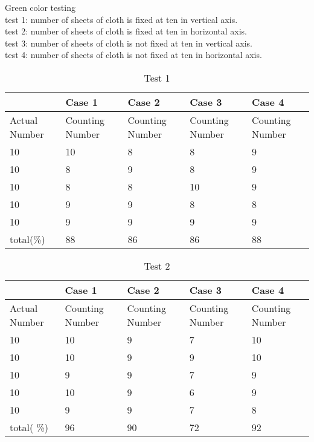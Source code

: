 Green color testing\\
test 1: number of sheets of cloth is fixed at ten in vertical axis.\\ 
test 2: number of sheets of cloth is fixed at ten in horizontal axis.\\
test 3: number of sheets of cloth is not fixed at ten in vertical axis.\\ 
test 4: number of sheets of cloth is not fixed at ten in horizontal axis.\\
\begin{table}[t]
	\centering
	\begin{tabular}{|p{1.5cm}|p{1.5cm}|p{1.5cm}|p{1.5cm}|p{1.5cm}|}
		\hline
		& Case 1 & Case 2 & Case 3 & Case 4\\
		\hline
		Actual Number & Counting Number & Counting Number & Counting Number & Counting Number\\
		\hline
		10 	& 10	& 8 & 8 	& 9	\\
		10  & 8	 	& 9 & 8		& 9	\\
		10	& 8		& 8	& 10	& 9	\\
		10	& 9		& 9	& 8		& 8	\\
		10	& 9		& 9	& 9		& 9	\\
		total(\%)& 	88	& 86	&	86	& 88	\\
		\hline
	\end{tabular}
	\caption{Test 1} \label{teb:test801}
\end{table}
\begin{table}[t]
	\centering
	\begin{tabular}{|p{1.5cm}|p{1.5cm}|p{1.5cm}|p{1.5cm}|p{1.5cm}|}
		\hline
		& Case 1 & Case 2 & Case 3 & Case 4\\
		\hline
		Actual Number & Counting Number & Counting Number & Counting Number & Counting Number\\
		\hline
		 10	&   10	&  	9	&  	7	& 10	\\
		 10	& 	10 	& 	9	& 	9	& 10	\\
		10	& 	9	&	9	& 	7	& 9	\\
		10	& 	10	& 	9	& 	6	& 9	\\
		10	& 	9	& 	9	& 	7	& 8	\\
		total( \%)& 96		&	90	&	72	& 92	\\
		\hline
	\end{tabular}
	\caption{Test 2} \label{teb:test802}
\end{table}
